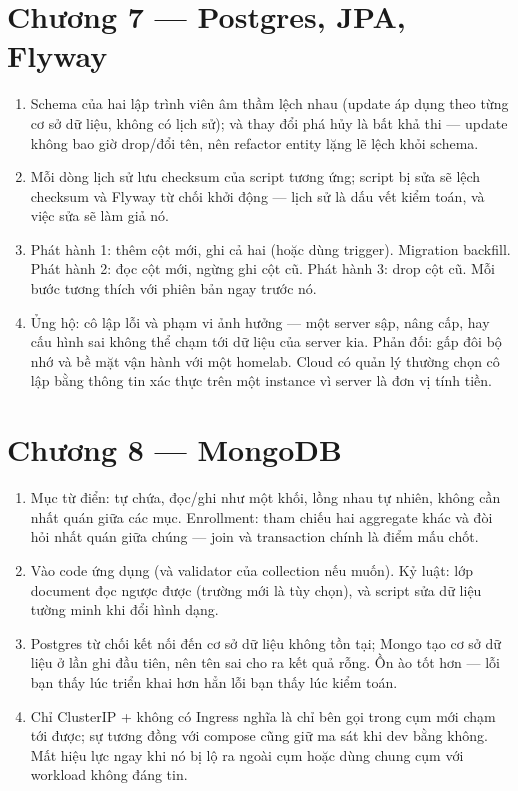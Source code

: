 \section*{Chương 7 --- Postgres, JPA, Flyway}
\begin{enumerate}
  \item Schema của hai lập trình viên âm thầm lệch nhau (update áp
  dụng theo từng cơ sở dữ liệu, không có lịch sử); và thay đổi phá hủy
  là bất khả thi --- update không bao giờ drop/đổi tên, nên refactor
  entity lặng lẽ lệch khỏi schema.
  \item Mỗi dòng lịch sử lưu checksum của script tương ứng; script bị
  sửa sẽ lệch checksum và Flyway từ chối khởi động --- lịch sử là dấu
  vết kiểm toán, và việc sửa sẽ làm giả nó.
  \item Phát hành 1: thêm cột mới, ghi cả hai (hoặc dùng trigger).
  Migration backfill. Phát hành 2: đọc cột mới, ngừng ghi cột cũ.
  Phát hành 3: drop cột cũ. Mỗi bước tương thích với phiên bản ngay
  trước nó.
  \item Ủng hộ: cô lập lỗi và phạm vi ảnh hưởng --- một server sập,
  nâng cấp, hay cấu hình sai không thể chạm tới dữ liệu của server
  kia. Phản đối: gấp đôi bộ nhớ và bề mặt vận hành với một homelab.
  Cloud có quản lý thường chọn cô lập bằng thông tin xác thực trên
  một instance vì server là đơn vị tính tiền.
\end{enumerate}

\section*{Chương 8 --- MongoDB}
\begin{enumerate}
  \item Mục từ điển: tự chứa, đọc/ghi như một khối, lồng nhau tự
  nhiên, không cần nhất quán giữa các mục. Enrollment: tham chiếu hai
  aggregate khác và đòi hỏi nhất quán giữa chúng --- join và
  transaction chính là điểm mấu chốt.
  \item Vào code ứng dụng (và validator của collection nếu muốn). Kỷ
  luật: lớp document đọc ngược được (trường mới là tùy chọn), và script
  sửa dữ liệu tường minh khi đổi hình dạng.
  \item Postgres từ chối kết nối đến cơ sở dữ liệu không tồn tại;
  Mongo tạo cơ sở dữ liệu ở lần ghi đầu tiên, nên tên sai cho ra kết
  quả rỗng. Ồn ào tốt hơn --- lỗi bạn thấy lúc triển khai hơn hẳn lỗi
  bạn thấy lúc kiểm toán.
  \item Chỉ ClusterIP + không có Ingress nghĩa là chỉ bên gọi trong cụm
  mới chạm tới được; sự tương đồng với compose cũng giữ ma sát khi dev
  bằng không. Mất hiệu lực ngay khi nó bị lộ ra ngoài cụm hoặc dùng
  chung cụm với workload không đáng tin.
\end{enumerate}

